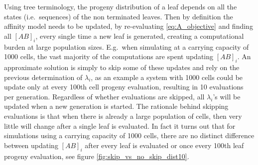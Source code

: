 Using tree terminology, the progeny distribution of a leaf depends on all the states (i.e.\ sequences) of the non terminated leaves.
Then by definition the affinity model needs to be updated, by re-evaluating \eqref{eq:A_objective} and finding all $[AB]_i$, every single time a new leaf is generated, creating a computational burden at large population sizes.
E.g.\ when simulating at a carrying capacity of 1000 cells, the vast majority of the computations are spent updating $[AB]_i$.
An approximate solution is simply to skip some of these updates and rely on the previous determination of $\lambda_i$, as an example a system with 1000 cells could be update only at every 100th cell progeny evaluation, resulting in 10 evaluations per generation.
Regardless of whether evaluations are skipped, all $\lambda_i$'s will be updated when a new generation is started.
The rationale behind skipping evaluations is that when there is already a large population of cells, then very little will change after a single leaf is evaluated.
In fact it turns out that for simulations using a carrying capacity of 1000 cells, there are no distinct difference between updating $[AB]_i$ after every leaf is evaluated or once every 100th leaf progeny evaluation, see figure \ref{fig:skip_vs_no_skip_dist10}.
